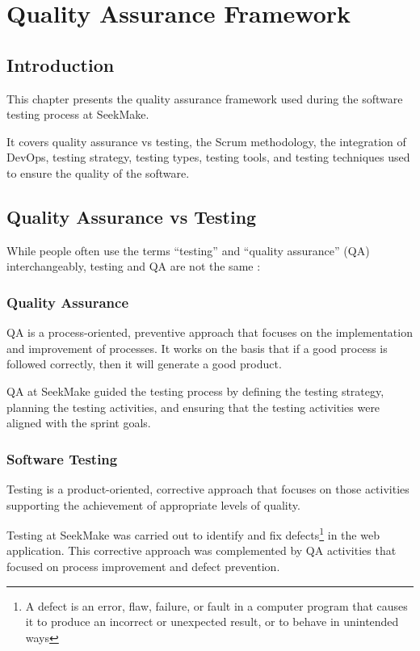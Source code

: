 \chapter{Quality Assurance Framework}

\section{Introduction}

This chapter presents the quality assurance framework used during the software testing process at SeekMake.

It covers quality assurance vs testing, the Scrum methodology, the integration of DevOps, testing strategy, testing types, testing tools, and testing techniques used to ensure the quality of the software.

\section{Quality Assurance vs Testing}

While people often use the terms “testing” and “quality assurance” (QA) interchangeably, testing and QA
are not the same \cite{istqbctfl4.0.1}:

\subsection{Quality Assurance}

QA is a process-oriented, preventive approach that focuses on the implementation and improvement of
processes. It works on the basis that if a good process is followed correctly, then it will generate a good
product. \cite{istqbctfl4.0.1}

QA at SeekMake guided the testing process by defining the testing strategy, planning the testing activities, and ensuring that the testing activities were aligned with the sprint goals.

\subsection{Software Testing}

Testing is a product-oriented, corrective approach that focuses on those activities supporting the
achievement of appropriate levels of quality. \cite{istqbctfl4.0.1}

Testing at SeekMake was carried out to identify and fix defects\footnote{A defect is an error, flaw, failure, or fault in a computer program that causes it to produce an incorrect or unexpected result, or to behave in unintended ways} in the web application. This corrective approach was complemented by QA activities that focused on process improvement and defect prevention.

